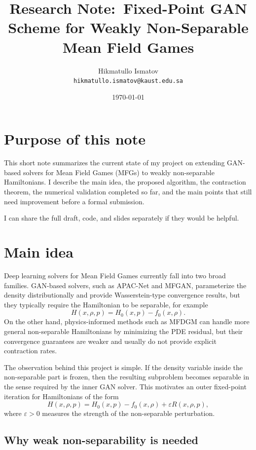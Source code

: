 \documentclass[11pt]{article}
\title{Research Note:\ Fixed-Point GAN Scheme for Weakly Non-Separable Mean Field Games}
\author{Hikmatullo Ismatov\\
\texttt{hikmatullo.ismatov@kaust.edu.sa}}
\date{\today}
\newcommand{\eps}{\varepsilon}
\begin{document}
\maketitle

\section*{Purpose of this note}

This short note summarizes the current state of my project on extending GAN-based solvers for Mean Field Games (MFGs) to weakly non-separable Hamiltonians. I describe the main idea, the proposed algorithm, the contraction theorem, the numerical validation completed so far, and the main points that still need improvement before a formal submission.

I can share the full draft, code, and slides separately if they would be helpful.

\section{Main idea}

Deep learning solvers for Mean Field Games currently fall into two broad families. GAN-based solvers, such as APAC-Net and MFGAN, parameterize the density distributionally and provide Wasserstein-type convergence results, but they typically require the Hamiltonian to be separable, for example
\[
  H(x,\rho,p)=H_0(x,p)-f_0(x,\rho).
\]
On the other hand, physics-informed methods such as MFDGM can handle more general non-separable Hamiltonians by minimizing the PDE residual, but their convergence guarantees are weaker and usually do not provide explicit contraction rates.

The observation behind this project is simple. If the density variable inside the non-separable part is frozen, then the resulting subproblem becomes separable in the sense required by the inner GAN solver. This motivates an outer fixed-point iteration for Hamiltonians of the form
\[
  H(x,\rho,p)=H_0(x,p)-f_0(x,\rho)+\eps R(x,\rho,p),
\]
where $\eps>0$ measures the strength of the non-separable perturbation.

\subsection*{Why weak non-separability is needed}
\end{document}
